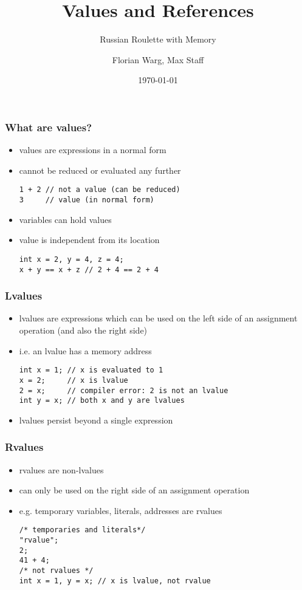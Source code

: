 



\title{Values and References}
\subtitle{Russian Roulette with Memory}
\date{\today}
\author{Florian Warg, Max Staff}

\maketitle

\begin{frame}[fragile]
    \frametitle{What are values?}
    \begin{itemize}
        \item values are expressions in a normal form
        \item cannot be reduced or evaluated any further
        \begin{lstlisting}[numbers=none]
1 + 2 // not a value (can be reduced)
3     // value (in normal form)
        \end{lstlisting}
        \item variables can hold values
        \item value is independent from its location
        \begin{lstlisting}[numbers=none]
int x = 2, y = 4, z = 4;
x + y == x + z // 2 + 4 == 2 + 4
        \end{lstlisting}
    \end{itemize}
\end{frame}

\begin{frame}[fragile]
    \frametitle{Lvalues}
    \begin{itemize}
        \item lvalues are expressions which can be used on the left side of an assignment operation (and also the right side)
        \item i.e. an lvalue has a memory address
        \begin{lstlisting}[numbers=none]
int x = 1; // x is evaluated to 1
x = 2;     // x is lvalue
2 = x;     // compiler error: 2 is not an lvalue
int y = x; // both x and y are lvalues
        \end{lstlisting}
        \item lvalues persist beyond a single expression
    \end{itemize}
\end{frame}

\begin{frame}[fragile]
    \frametitle{Rvalues}
    \begin{itemize}
        \item rvalues are non-lvalues
        \item can only be used on the right side of an assignment operation
        \item e.g. temporary variables, literals, addresses are rvalues
        \begin{lstlisting}[numbers=none]
/* temporaries and literals*/
"rvalue"; 
2;
41 + 4;
/* not rvalues */
int x = 1, y = x; // x is lvalue, not rvalue
        \end{lstlisting}
    \end{itemize}
\end{frame}

